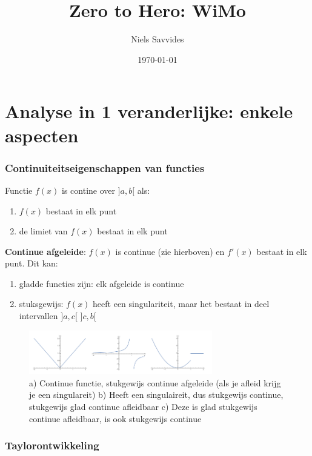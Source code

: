 \documentclass[a4paper]{report}
\title{Zero to Hero: WiMo}
\author{Niels Savvides}
\date{\today}
\begin{document}
\maketitle
\tableofcontents

\chapter{Analyse in 1 veranderlijke: enkele aspecten}

\subsection{Continuiteitseigenschappen van functies}

Functie $f(x)$ is contine over $]a,b[$ als:
\begin{enumerate}
	\item $f(x)$ bestaat in elk punt
	\item de limiet van $f(x)$ bestaat in elk punt
\end{enumerate}

\textbf{Continue afgeleide}: $f(x)$ is continue (zie hierboven) en $f'(x)$ bestaat in elk punt.
Dit kan:
\begin{enumerate}
	\item gladde functies zijn: elk afgeleide is continue
	\item stuksgewijs: $f(x)$ heeft een singulariteit, maar het bestaat in deel intervallen $]a, c[$ $]c, b[$
\end{enumerate}

\begin{figure}[!htbp]
	\begin{center}
		\includegraphics[width=8cm]{./images/continu.png}
	\end{center}
	\caption{a) Continue functie, stukgewijs continue afgeleide (als je afleid krijg je een singulareit) b) Heeft een singulaireit, dus stukgewijs continue, stukgewijs glad continue afleidbaar c) Deze is glad stukgewijs continue afleidbaar, is ook stukgewijs continue }
\end{figure}


\subsection{Taylorontwikkeling}
\label{sec:taylor}
\end{document}
